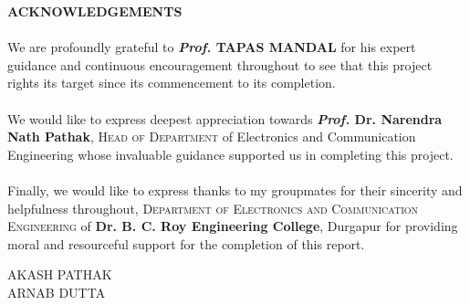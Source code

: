 \begin{center}
\thispagestyle{empty}
\LARGE{\textbf{ACKNOWLEDGEMENTS}}\\[1cm]
\end{center}
\linespread{1.13}
\large{\paragraph{}We are profoundly grateful to \textbf{\emph{Prof.} TAPAS MANDAL} for his expert guidance
and continuous encouragement throughout to see that this project rights its
target since its commencement to its completion.}

\large{\paragraph{}We would like to express deepest appreciation towards \textbf{\emph{Prof.} Dr. Narendra Nath Pathak}, \textsc{Head of Department} of Electronics and Communication Engineering whose invaluable guidance supported us in completing this project.}
\large{\paragraph{}Finally, we would like to express thanks to my groupmates for their sincerity and helpfulness throughout, \textsc{Department of Electronics and Communication Engineering} of \textbf{Dr. B. C. Roy Engineering College}, Durgapur for providing moral and resourceful support for the completion of this report.}
\vspace{3.0cm}
\begin{flushright}
{
AKASH PATHAK\\
ARNAB DUTTA\\
}
\end{flushright}
\newpage
